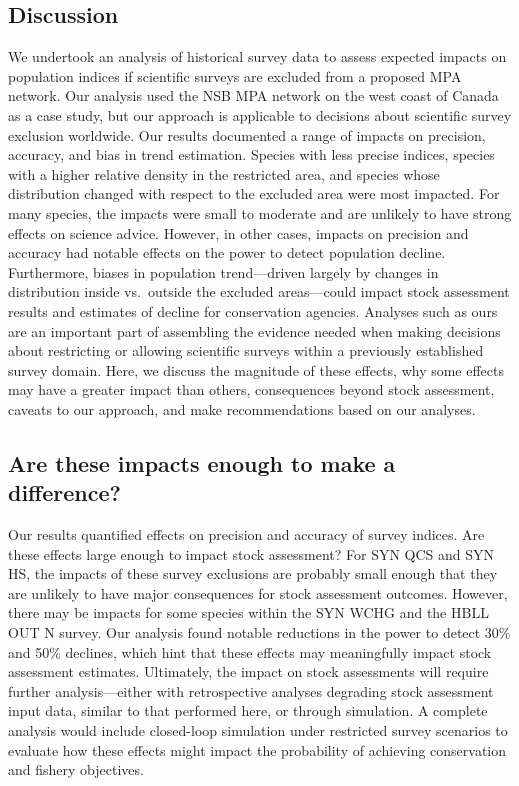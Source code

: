 \documentclass[12pt]{article}
\begin{document}
\begin{spacing}{1.4}
\section*{Discussion}

We undertook an analysis of historical survey data to assess expected impacts on population indices if scientific surveys are excluded from a proposed MPA network.
Our analysis used the NSB MPA network on the west coast of Canada as a case study, but our approach is applicable to decisions about scientific survey exclusion worldwide.
Our results documented a range of impacts on precision, accuracy, and bias in trend estimation.
Species with less precise indices, species with a higher relative density in the restricted area, and species whose distribution changed with respect to the excluded area were most impacted.
For many species, the impacts were small to moderate and are unlikely to have strong effects on science advice.
However, in other cases, impacts on precision and accuracy had notable effects on the power to detect population decline.
Furthermore, biases in population trend---driven largely by changes in distribution inside vs.\ outside the excluded areas---could impact stock assessment results and estimates of decline for conservation agencies.
Analyses such as ours are an important part of assembling the evidence needed when making decisions about restricting or allowing scientific surveys within a previously established survey domain.
Here, we discuss the magnitude of these effects, why some effects may have a greater impact than others, consequences beyond stock assessment, caveats to our approach, and make recommendations based on our analyses.

\subsection*{Are these impacts enough to make a difference?}

Our results quantified effects on precision and accuracy of survey indices.
Are these effects large enough to impact stock assessment?
For SYN QCS and SYN HS, the impacts of these survey exclusions are probably small enough that they are unlikely to have major consequences for stock assessment outcomes.
However, there may be impacts for some species within the SYN WCHG and the HBLL OUT N survey.
Our analysis found notable reductions in the power to detect 30\% and 50\% declines, which hint that these effects may meaningfully impact stock assessment estimates.
Ultimately, the impact on stock assessments will require further analysis---either with retrospective analyses degrading stock assessment input data, similar to that performed here, or through simulation.
A complete analysis would include closed-loop simulation \citep{punt2016} under restricted survey scenarios to evaluate how these effects might impact the probability of achieving conservation and fishery objectives.


\end{spacing}
\end{document}

